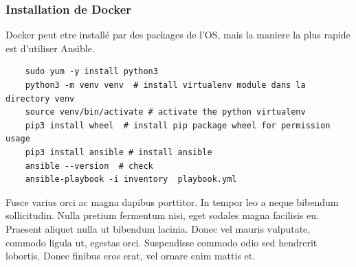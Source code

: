 \documentclass{article}
\begin{document}
\subsubsection{Installation de Docker}
Docker peut etre installé par des packages de l'OS, mais la maniere la plus rapide est d'utiliser Ansible.
\begin{commandline}
	\begin{verbatim}
	sudo yum -y install python3
	python3 -m venv venv  # install virtualenv module dans la directory venv
  	source venv/bin/activate # activate the python virtualenv
  	pip3 install wheel  # install pip package wheel for permission usage
  	pip3 install ansible # install ansible
  	ansible --version  # check
	ansible-playbook -i inventory  playbook.yml
	\end{verbatim}
\end{commandline}



Fusce varius orci ac magna dapibus porttitor. In tempor leo a neque bibendum sollicitudin. Nulla pretium fermentum nisi, eget sodales magna facilisis eu. Praesent aliquet nulla ut bibendum lacinia. Donec vel mauris vulputate, commodo ligula ut, egestas orci. Suspendisse commodo odio sed hendrerit lobortis. Donec finibus eros erat, vel ornare enim mattis et.

\end{document}
